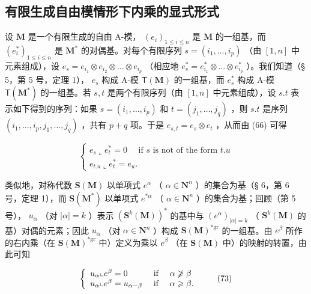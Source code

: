 \subsection{有限生成自由模情形下内乘的显式形式}

设 \(\mathbf{M}\) 是一个有限生成的自由 A-模， \((e_i)_{1\leq i\leq n}\) 是 \(\mathbf{M}\) 的一组基，而 \((e_i^*)_{1\leq i\leq n}\) 是 \(\mathbf{M}^*\) 的对偶基。对每个有限序列 \(s = (i_1,\ldots ,i_p)\) （由 \([1,n]\) 中元素组成），设 \(e_s = e_{i_1}\otimes e_{i_2}\otimes \dots \otimes e_{i_p}\) （相应地 \(e_s^* = e_{i_1}^*\otimes \dots \otimes e_{i_p}^*\) ）。我们知道（§ 5，第 5 号，定理 1）， \(e_s\) 构成 A-模 \(\mathsf{T}(\mathbf{M})\) 的一组基，而 \(e_s^*\) 构成 A-模 \(\mathsf{T}(\mathbf{M}^*)\) 的一组基。若 \(s,t\) 是两个有限序列（由 \([1,n]\) 中元素组成），设 \(s.t\) 表示如下得到的序列：如果 \(s = (i_1,\ldots ,i_p)\) 和 \(t = (j_1,\ldots ,j_q)\) ，则 \(s.t\) 是序列 \((i_1,\ldots ,i_p,j_1,\ldots ,j_q)\) ，共有 \(p + q\) 项。于是 \(e_{s,t} = e_s\otimes e_t\) ，从而由 (66) 可得

\[
\left\{ \begin{array}{l} e _ {s} \llcorner e _ {t} ^ {*} = 0 \quad \text { if   } s \text {   is   not   of   the   form   } t. u \\ e _ {t. u} \llcorner e _ {t} ^ {*} = e _ {u}. \end{array} \right.\tag{72}
\]

类似地，对称代数 \(\mathbf{S}(\mathbf{M})\) 以单项式 \(e^{\alpha}\) （ \(\alpha \in \mathbf{N}^{n}\) ）的集合为基（§ 6，第 6 号，定理 1），而 \(\mathbf{S}(\mathbf{M}^{*})\) 以单项式 \(e^{*\alpha}\) （ \(\alpha \in \mathbf{N}^{n}\) ）的集合为基；回顾（第 5 号）， \(u_{\alpha}\) （对 \(|\alpha| = k\) ）表示 \((\mathbf{S}^{k}(\mathbf{M}))^{*}\) 的基中与 \((e^{\alpha})_{|\alpha| = k}\) （ \(\mathbf{S}^{k}(\mathbf{M})\) 的基）对偶的元素；因此 \(u_{\alpha}\) （对 \(\alpha \in \mathbf{N}^{n}\) ）构成 \(\mathbf{S}(\mathbf{M})^{*\mathrm{gr}}\) 的一组基。由 \(e^{\beta}\) 所作的右内乘（在 \(\mathbf{S}(\mathbf{M})^{*\mathrm{gr}}\) 中）定义为乘以 \(e^{\beta}\) （在 \(\mathbf{S}(\mathbf{M})\) 中）的映射的转置，由此可知

\[
\left\{ \begin{array}{l l} u _ {\alpha} \llcorner e ^ {\beta} = 0 & \text { if } \quad \alpha \not \geqslant \beta \\ u _ {\alpha} \llcorner e ^ {\beta} = u _ {\alpha - \beta} & \text { if } \quad \alpha \geqslant \beta . \end{array} \right.\tag{73}
\]

